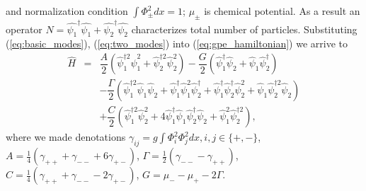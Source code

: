 \documentclass[aps, pre, preprint, groupedaddress, superscriptaddress, showkeys, showpacs] {revtex4-1}
\begin{document}
%
and normalization condition $\int \Phi_{\pm}^2 dx = 1$; $\mu_{\pm}$ is chemical potential.
As a result an operator $N=\hat{\psi_1}^\dag\hat{\psi_1} + \hat{\psi_2}^\dag\hat{\psi_2}$ characterizes total number of particles.
Substituting (\ref{eq:basic_modes}), (\ref{eq:two_modes}) into (\ref{eq:gpe_hamiltonian}) we arrive to
% 
\begin{equation}
\begin{array}{lcl}
\hat{H} & = & \dfrac{A}{2} (\hat{\psi}_1^{\dag 2} \hat{\psi}_1^2 + \hat{\psi}_2^{\dag 2} \hat{\psi}_2^2) - \dfrac{G}{2} (\hat{\psi}_1^\dag \hat{\psi}_2 + \hat{\psi}_1 \hat{\psi}_2^\dag) \\ [8pt]
& & -\dfrac{\Gamma}{2} (\hat{\psi}_1^{\dag 2} \hat{\psi}_1 \hat{\psi}_2 + \hat{\psi}_1^\dag \hat{\psi}_1^2 \hat{\psi}_2^\dag + \hat{\psi}_1^\dag \hat{\psi}_2^\dag \hat{\psi}_2^2 + \hat{\psi}_1 \hat{\psi}_2^{\dag 2} \hat{\psi}_2) \\ [8pt]
& & +\dfrac{C}{2} (\hat{\psi}_1^{\dag 2} \hat{\psi}_2^2 + 4 \hat{\psi}_1^\dag \hat{\psi}_1 \hat{\psi}_2^\dag \hat{\psi}_2 + \hat{\psi}_1^2 \hat{\psi}_2^{\dag 2}),
\end{array}
\label{eq:hamiltonian}
\end{equation}
%
where we made denotations $\gamma_{ij} = g \int \Phi_i^2 \Phi_j^2 dx, i,j \in \{+,-\}$,
$A = \frac{1}{4} (\gamma_{++} + \gamma_{--} + 6 \gamma_{+-})$, $\Gamma = \frac{1}{2} (\gamma_{--} - \gamma_{++})$, $C = \frac{1}{4} (\gamma_{++} + \gamma_{--} - 2\gamma_{+-})$, $G = \mu_- - \mu_+ - 2\Gamma$.
\end{document}
